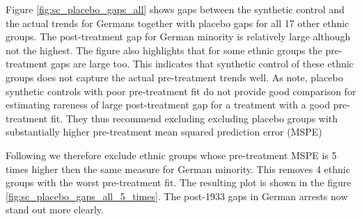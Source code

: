 Figure \ref{fig:sc_placebo_gaps_all} shows gaps between the synthetic control and the actual trends for Germans together with placebo gaps for all 17 other ethnic groups. The post-treatment gap for German minority is relatively large although not the highest. The figure also highlights that for some ethnic groups the pre-treatment gaps are large too. This indicates that synthetic control of these ethnic groups does not capture the actual pre-treatment trends well. As \citet{abadie_synthetic_2010} note, placebo synthetic controls  with poor pre-treatment fit do not provide good comparison
for estimating rareness of large  post-treatment gap for a treatment with a good pre-treatment fit. They thus recommend excluding excluding placebo groups with substantially higher pre-treatment mean squared prediction error  (MSPE)

Following \citet{abadie_synthetic_2010}  we therefore exclude ethnic groups whose pre-treatment MSPE is 5 times higher then the same measure for German minority. This removes 4 ethnic groups with the worst pre-treatment fit. The resulting plot is shown in the figure \ref{fig:sc_placebo_gaps_all_5_times}. The post-1933 gaps in German arrests now stand out more clearly. 

